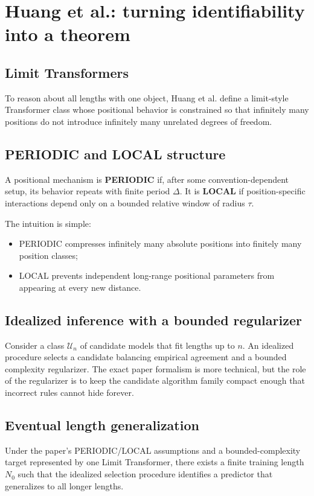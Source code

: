 \documentclass[11pt,a4paper,oneside,openany]{memoir}
\theoremstyle{definition}
\begin{document}
\chapter{Huang et al.: turning identifiability into a theorem}
\section{Limit Transformers}
To reason about all lengths with one object, Huang et al. define a limit-style Transformer class whose positional behavior is constrained so that infinitely many positions do not introduce infinitely many unrelated degrees of freedom.

\section{PERIODIC and LOCAL structure}
A positional mechanism is \textbf{PERIODIC} if, after some convention-dependent setup, its behavior repeats with finite period $\Delta$.  It is \textbf{LOCAL} if position-specific interactions depend only on a bounded relative window of radius $\tau$.

The intuition is simple:
\begin{itemize}
\item PERIODIC compresses infinitely many absolute positions into finitely many position classes;
\item LOCAL prevents independent long-range positional parameters from appearing at every new distance.
\end{itemize}

\section{Idealized inference with a bounded regularizer}
Consider a class $\mathcal U_n$ of candidate models that fit lengths up to $n$.  An idealized procedure selects a candidate balancing empirical agreement and a bounded complexity regularizer.  The exact paper formalism is more technical, but the role of the regularizer is to keep the candidate algorithm family compact enough that incorrect rules cannot hide forever.

\section{Eventual length generalization}
Under the paper's PERIODIC/LOCAL assumptions and a bounded-complexity target represented by one Limit Transformer, there exists a finite training length $N_0$ such that the idealized selection procedure identifies a predictor that generalizes to all longer lengths.
\end{document}
